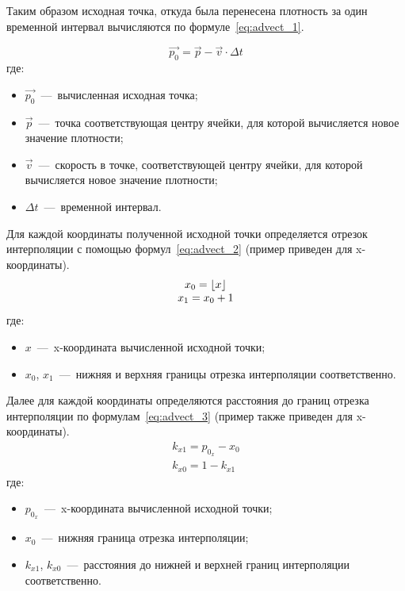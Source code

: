 Таким образом исходная точка, откуда была перенесена плотность за один временной интервал вычисляются по формуле~\ref{eq:advect_1}. 

\begin{equation}
	\label{eq:advect_1}
	\vec{p_0} = \vec{p} - \vec{v} \cdot \Delta t
\end{equation}
где:
\begin{itemize}
	\item $\vec{p_0}$~---~вычисленная исходная точка;
	\item $\vec{p}$~---~точка соответствующая центру ячейки, для которой вычисляется новое значение плотности;
	\item $\vec{v}$~---~скорость в точке, соответствующей центру ячейки, для которой вычисляется новое значение плотности;
	\item $\Delta t$~---~временной интервал.
\end{itemize}

Для каждой координаты полученной исходной точки определяется отрезок интерполяции с помощью формул~\ref{eq:advect_2} (пример приведен для x-координаты). 
\begin{equation}
	\label{eq:advect_2}
	\begin{matrix}
		x_0 = \lfloor x \rfloor \\
		x_1 = x_0 + 1
	\end{matrix}
\end{equation}
где:
\begin{itemize}
	\item $x$~---~x-координата вычисленной исходной точки;
	\item $x_0$, $x_1$~---~нижняя и верхняя границы отрезка интерполяции соответственно.
\end{itemize}

Далее для каждой координаты определяются расстояния до границ отрезка интерполяции по формулам~\ref{eq:advect_3} (пример также приведен для x-координаты).
\begin{equation}
	\label{eq:advect_3}
	\begin{matrix}
		k_{x1} = p_{0_x} - x_0 \\
		k_{x0} = 1 - k_{x1}
	\end{matrix}
\end{equation}
где:
\begin{itemize}
	\item $p_{0_x}$~---~x-координата вычисленной исходной точки;
	\item $x_0$~---~нижняя граница отрезка интерполяции;
	\item $k_{x1}$, $k_{x0}$~---~расстояния до нижней и верхней границ интерполяции соответственно.
\end{itemize}

